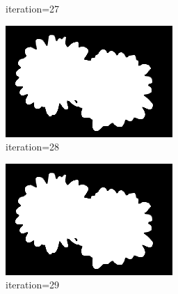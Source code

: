 \documentclass{article}
\begin{document}
\begin{figure}[t]
\begin{subfigure}[t]{0.19\textwidth}
\vspace{-0.6cm}
\caption{iteration=27}
\end{subfigure}
\begin{subfigure}[t]{0.19\textwidth}
\centering
\includegraphics[width=\textwidth]{./images/marginals_iter_28.png}
\vspace{-0.6cm}
\caption{iteration=28}
\end{subfigure}
\begin{subfigure}[t]{0.19\textwidth}
\centering
\includegraphics[width=\textwidth]{./images/marginals_iter_29.png}
\vspace{-0.6cm}
\caption{iteration=29}
\end{subfigure}
\begin{subfigure}[t]{0.19\textwidth}
\centering

\end{subfigure}
\end{figure}
\end{document}
